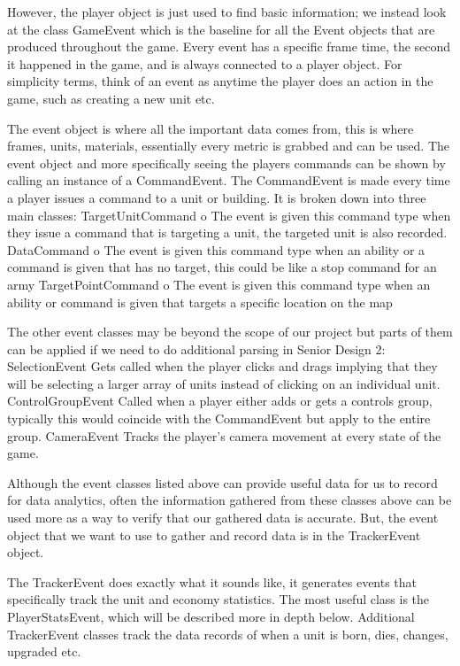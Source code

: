 \documentclass[a4paper,12pt]{report}
\begin{document}
However, the player object is just used to find basic information; we instead look at the class GameEvent which is the baseline for all the Event objects that are produced throughout the game. Every event has a specific frame time, the second it happened in the game, and is always connected to a player object. For simplicity terms, think of an event as anytime the player does an action in the game, such as creating a new unit etc.

The event object is where all the important data comes from, this is where frames, units, materials, essentially every metric is grabbed and can be used. The event object and more specifically seeing the players commands can be shown by calling an instance of a CommandEvent. The CommandEvent is made every time a player issues a command to a unit or building. It is broken down into three main classes:
TargetUnitCommand
o   The event is given this command type when they issue a command that is targeting a unit, the targeted unit is also recorded.
  DataCommand
o   The event is given this command type when an ability or a command is given that has no target, this could be like a stop command for an army
 TargetPointCommand
o   The event is given this command type when an ability or command is given that targets a specific location on the map

The other event classes may be beyond the scope of our project but parts of them can be applied if we need to do additional parsing in Senior Design 2:
SelectionEvent
Gets called when the player clicks and drags implying that they will be selecting a larger array of units instead of clicking on an individual unit. 
ControlGroupEvent
Called when a player either adds or gets a controls group, typically this would coincide with the CommandEvent but apply to the entire group.
CameraEvent
Tracks the player's camera movement at every state of the game. 

Although the event classes listed above can provide useful data for us to record for data analytics, often the information gathered from these classes above can be used more as a way to verify that our gathered data is accurate. But, the event object that we want to use to gather and record data is in the TrackerEvent object.

The TrackerEvent does exactly what it sounds like, it generates events that specifically track the unit and economy statistics. The most useful class is the PlayerStatsEvent, which will be described more in depth below. Additional TrackerEvent classes track the data records of when a unit is born, dies, changes, upgraded etc.
\end{document}
